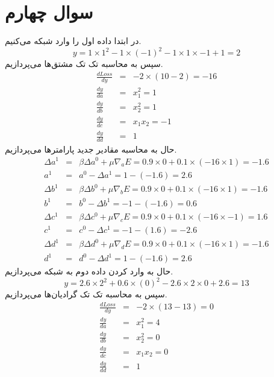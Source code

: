 \documentclass[12pt]{article}
\begin{document}
		\section{سوال چهارم}
		در ابتدا داده اول را وارد شبکه می‌کنیم.
		\begin{equation}
			y=1\times 1^{2} -1\times (-1)^{2} -1\times 1 \times -1 + 1 = 2
		\end{equation}
		سپس به محاسبه تک تک مشتق‌ها می‌پردازیم.
		\begin{eqnarray*}
			\frac{dLoss}{dy} &=& -2\times(10 - 2) = -16\\
			\frac{dy}{da} &=& x_{1}^{2} = 1\\
			\frac{dy}{db} &=& x_{2}^{2} = 1 \\
			\frac{dy}{dc} &=& x_{1}x_{2} = -1\\
			\frac{dy}{dd} &=& 1
		\end{eqnarray*}
		حال به محاسبه مقادیر جدید پارامترها می‌پردازیم.
		\begin{eqnarray*}
			\Delta a^{1} &=& \beta \Delta a^{0} + \mu \nabla_{a}E = 0.9\times0 + 0.1\times (-16\times1) = -1.6\\
			a^{1} &=& a^{0} - \Delta a^{1} = 1 - (-1.6) = 2.6\\
			\Delta b^{1} &=& \beta \Delta b^{0} + \mu \nabla_{b}E = 0.9\times0 + 0.1\times (-16\times1) = -1.6\\
			b^{1} &=& b^{0} - \Delta b^{1} = -1 - (-1.6) = 0.6\\
			\Delta c^{1} &=& \beta \Delta c^{0} + \mu \nabla_{c}E = 0.9\times0 + 
			0.1\times (-16\times-1) = 1.6\\
			c^{1}  &=& c^{0} - \Delta c^{1} = -1 - (1.6) = -2.6\\
			\Delta d^{1} &=& \beta \Delta d^{0} + \mu \nabla_{d}E = 0.9\times0 + 
			0.1\times (-16\times1) = -1.6\\
			d^{1} &=& d^{0} - \Delta d^{1} = 1 - (-1.6) = 2.6
		\end{eqnarray*}
		حال به وارد کردن داده دوم به شبکه می‌پردازیم.
		\begin{equation}
			y=2.6\times2^{2} +0.6\times(0)^{2}  -2.6\times2\times0 +2.6 = 13
		\end{equation}
		سپس به محاسبه تک تک گرادیان‌ها می‌پردازیم.
		\begin{eqnarray*}
			\frac{dLoss}{dy} &=& -2\times(13 - 13) = 0\\
			\frac{dy}{da} &=& x_1^{2} = 4\\
			\frac{dy}{db} &=& x_2^{2} = 0\\
			\frac{dy}{dc} &=& x_{1}x_{2} = 0\\
			\frac{dy}{dd} &=& 1
		\end{eqnarray*}
\end{document}

